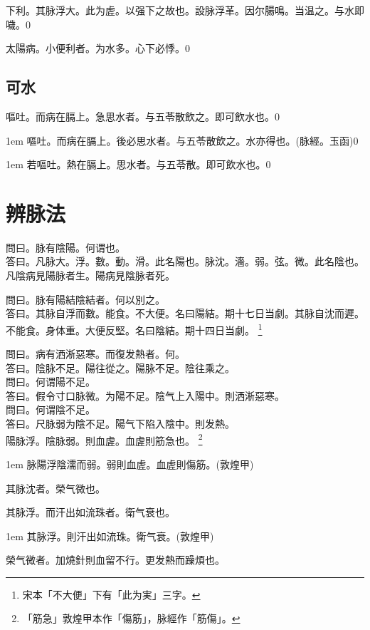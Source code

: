 下利。其脉浮大。此为虗。以强下之故也。設脉浮革。因尔腸鳴。当温之。与水即噦。0

太陽病。小便利者。为水多。心下必悸。0

\section{可水}

嘔吐。而病在膈上。急思水者。与五苓散飲之。即可飲水也。0

\hangindent 1em
嘔吐。而病在膈上。後必思水者。与五苓散飲之。水亦得也。(脉經。玉函)0

\hangindent 1em
若嘔吐。熱在膈上。思水者。与五苓散。即可飲水也。{\gaoben}0

\chapter{辨脉法}

問曰。脉有陰陽。何谓也。\\
答曰。凡脉大。浮。數。動。滑。此名陽也。脉沈。濇。弱。弦。微。此名陰也。凡陰病見陽脉者生。陽病見陰脉者死。

問曰。脉有陽結陰結者。何以別之。\\
答曰。其脉{\khaaitp 自}浮而數。能食。不大便。名曰陽結。期十七日当劇。其脉{\khaaitp 自}沈而遲。不能食。身体重。大便反堅。名曰陰結。期十四日当劇。
	\footnote{宋本「不大便」下有「此为実」三字。}

問曰。病有洒淅惡寒。而復发熱者。何。\\
答曰。陰脉不足。陽往從之。陽脉不足。陰往乘之。\\
問曰。何谓陽不足。\\
答曰。假令寸口脉微。为陽不足。陰气上入陽中。則洒淅惡寒。\\
問曰。何谓陰不足。\\
答曰。尺脉弱为陰不足。陽气下陷入陰中。則发熱。\\

陽脉浮。陰脉弱。則血虗。血虗則筋急也。
	\footnote{「筋急」敦煌甲本作「傷筋」，脉經作「筋傷」。}

\hangindent 1em
脉陽浮陰濡而弱。弱則血虗。血虗則傷筋。(敦煌甲)

其脉沈者。榮气微也。

其脉浮。而汗出如流珠者。衛气衰也。

\hangindent 1em
其脉浮。則汗出如流珠。衛气衰。(敦煌甲)

榮气微者。加燒針則血留不行。更发熱而躁煩也。

